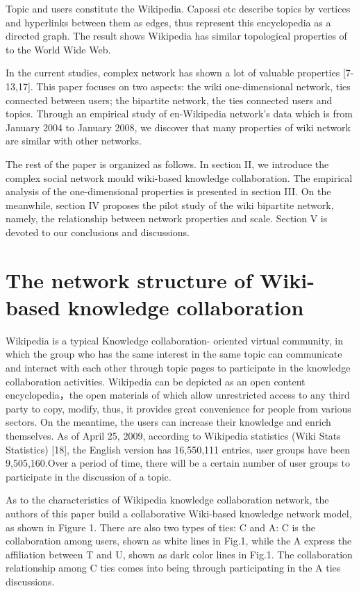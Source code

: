 \documentclass{elsarticle}
\begin{document}
Topic and users constitute the Wikipedia. Capossi etc describe topics by vertices and hyperlinks between them as edges, thus represent
this encyclopedia as a directed graph. The result shows Wikipedia has
similar topological properties of to the World Wide Web.



In the current studies, complex network has shown a lot of valuable properties [7-13,17]. This paper focuses on two aspects: the wiki one-dimensional network, ties connected between users; the bipartite network, the ties connected users and topics. Through an empirical study of en-Wikipedia network’s data which is from January 2004 to January 2008, we discover that many properties of wiki network are similar with other networks. 

The rest of the paper is organized as follows. In section II, we
introduce the complex social network mould wiki-based knowledge
collaboration. The empirical analysis of the one-dimensional
properties is presented in section III. On the meanwhile, section IV
proposes the pilot study of the wiki bipartite network, namely, the
relationship between network properties and scale. Section V is
devoted to our conclusions and discussions.

\section{The network structure of Wiki-based knowledge collaboration}
\label{sec:netw-struct-wiki}

Wikipedia is a typical Knowledge collaboration- oriented virtual community, in which the group who has the same interest in the same topic can communicate and interact with each other through topic pages to participate in the knowledge collaboration activities. Wikipedia can be depicted as an open content encyclopedia，the open materials of which allow unrestricted access to any third party to copy, modify, thus, it  provides great convenience for people from various sectors. On the meantime, the users can increase their knowledge and enrich themselves. As of April 25, 2009, according to Wikipedia statistics (Wiki Stats Statistics) [18], the English version has 16,550,111 entries, user groups have been 9,505,160.Over a period of time, there will be a certain number of user groups to participate in the discussion of a topic.

As to the characteristics of Wikipedia knowledge collaboration network, the authors of this paper build a collaborative Wiki-based knowledge network model, as shown in Figure 1. There are also two types of ties: C and A: C is the collaboration among users, shown as white lines in Fig.1, while the A express the affiliation between T and U, shown as dark color lines in Fig.1. The collaboration relationship among C ties comes into being through participating in the A ties discussions.  
\end{document}
